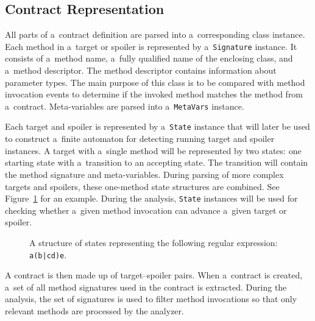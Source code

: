 \subsection{Contract Representation}
All parts of a~contract definition are parsed into a~corresponding class
instance. Each method in a~target or spoiler is represented by
a~\texttt{Signature} instance. It consists of a~method name, a~fully qualified
name of the enclosing class, and a~method descriptor. The method descriptor
contains information about parameter types. The main purpose of this class is to
be compared with method invocation events to determine if the invoked method
matches the method from a~contract. Meta-variables are parsed into
a~\texttt{MetaVars} instance.

Each target and spoiler is represented by a~\texttt{State} instance that will
later be used to construct a~finite automaton for detecting running target and
spoiler instances. A target with a~single method will be represented by two
states: one starting state with a~transition to an accepting state. The
transition will contain the method signature and meta-variables. During parsing
of more complex targets and spoilers, these one-method state structures are
combined. See Figure~\ref{states} for an example. During the analysis,
\texttt{State} instances will be used for checking whether a~given method
invocation can advance a~given target or spoiler.

\begin{figure}[hbt]
    \begin{center}
        \label{states}
        
        \caption{A structure of states representing the following regular
        expression: \texttt{a(b|cd)e}.}
    \end{center}
\end{figure}

A contract is then made up of target--spoiler pairs. When a~contract is created,
a~set of all method signatures used in the contract is extracted. During the
analysis, the set of signatures is used to filter method invocations so that
only relevant methods are processed by the analyzer.

